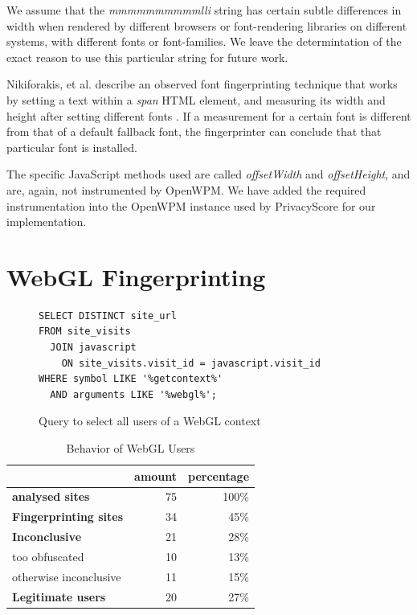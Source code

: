 \documentclass[
    fontsize=12pt,
    headings=small,
    parskip=half,
    bibliography=totoc,
    numbers=noenddot,
    open=any
    ]{scrreprt}
\begin{document}
We assume that the \textit{mmmmmmmmmmlli} string has certain subtle differences in width
when rendered by different browsers or font-rendering libraries on different systems, with
different fonts or font-families. We leave the determintation of the exact reason to use
this particular string for future work.

Nikiforakis, et al. describe an observed font fingerprinting technique that works by setting
a text within a \textit{span} HTML element, and measuring its width and height after setting
different fonts \cite{nikiforakis2013cookieless}. If a measurement for a certain font is different
from that of a default fallback font, the fingerprinter can conclude that that particular font
is installed.

The specific JavaScript methods used are called \textit{offsetWidth} and \textit{offsetHeight},
and are, again, not instrumented by OpenWPM. We have added the required instrumentation into
the OpenWPM instance used by PrivacyScore for our implementation.


\section{WebGL Fingerprinting}

\begin{figure}
\begin{verbatim}
SELECT DISTINCT site_url
FROM site_visits
  JOIN javascript
    ON site_visits.visit_id = javascript.visit_id
WHERE symbol LIKE '%getcontext%'
  AND arguments LIKE '%webgl%';
\end{verbatim}
\caption{Query to select all users of a WebGL context}
\label{code:webgl_query}
\end{figure}

\begin{table}
\centering
\caption{Behavior of WebGL Users}
\begin{tabular}{l r r}
    \toprule
    & amount & percentage \\
    \midrule
    \textbf{analysed sites} & 75 & 100\% \\
    \midrule
    \textbf{Fingerprinting sites} & 34 & 45\% \\
    \midrule
    \textbf{Inconclusive} & 21 & 28\% \\
    too obfuscated & 10 & 13\% \\
    otherwise inconclusive & 11 & 15\% \\
    \midrule
    \textbf{Legitimate users} & 20 & 27\% \\
    \bottomrule
\end{tabular}
\label{table:webgl_users}
\end{table}
\end{document}

